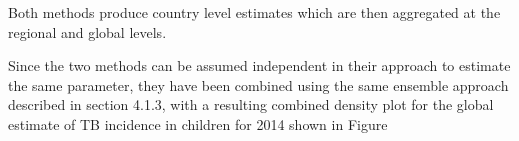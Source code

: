 Both methods produce country level estimates which are then aggregated at the regional and global levels.

Since the two methods can be assumed independent in their approach to estimate the same parameter, they have been combined using the same ensemble approach described in section 4.1.3, with a resulting combined density plot for the global estimate of TB incidence in children for 2014 shown in Figure %

